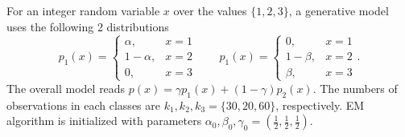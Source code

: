 \documentclass[a4paper, 10pt]{article}
\begin{document}
For an integer random variable $x$ over the values $\{1, 2, 3\}$, a generative model uses the following 2 distributions
\begin{equation}
    p_1(x) = \left\{\begin{array}{ll}
        \alpha, & x = 1 \\ 
        1 - \alpha, & x = 2 \\ 
        0, & x=3
    \end{array}\right.\qquad 
    p_1(x) = \left\{\begin{array}{ll}
        0, & x = 1 \\ 
        1 - \beta, & x = 2 \\ 
        \beta, & x=3
    \end{array}\right. .
\end{equation}
The overall model reads $p(x) = \gamma p_1(x) + (1 - \gamma) p_2(x)$. The numbers of observations in each classes are $k_1, k_2, k_3 = \{30, 20, 60\}$, respectively. EM algorithm is initialized with parameters $\alpha_0, \beta_0, \gamma_0 = \left(\frac{1}{2}, \frac{1}{2}, \frac{1}{2}\right)$.
\end{document}

